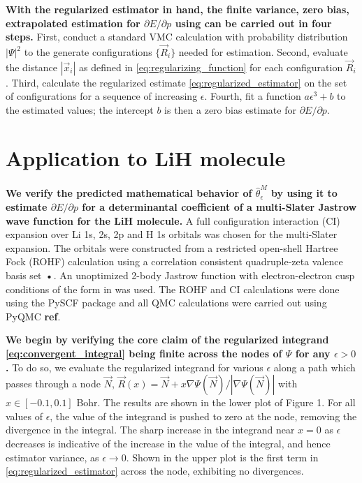\documentclass{article}
\begin{document}
\textbf{With the regularized estimator in hand, the finite variance, zero bias, extrapolated estimation for $\partial E/\partial p$ using can be carried out in four steps.}
First, conduct a standard VMC calculation with probability distribution $|\Psi|^2$ to the generate configurations $\{\vec{R}_i\}$ needed for estimation.
Second, evaluate the distance $|\vec{x}_i|$ as defined in \eqref{eq:regularizing_function} for each configuration $\vec{R}_i$.
Third, calculate the regularized estimate \eqref{eq:regularized_estimator} on the set of configurations for a sequence of increasing $\epsilon$.
Fourth, fit a function $a\epsilon^3 + b$ to the estimated values; the intercept $b$ is then a zero bias estimate for $\partial E/\partial p.$

\section{Application to LiH molecule}
\textbf{We verify the predicted mathematical behavior of $\hat{\theta}_\epsilon^M$ by using it to estimate $\partial E/\partial p$ for a determinantal coefficient of a multi-Slater Jastrow wave function for the LiH molecule.}
A full configuration interaction (CI) expansion over Li 1s, 2s, 2p and H 1s orbitals was chosen for the multi-Slater expansion.
The orbitals were constructed from a restricted open-shell Hartree Fock (ROHF) calculation using a correlation consistent quadruple-zeta valence basis set \cite{doi:10.1063/1.456153}\textbf{•}.
An unoptimized 2-body Jastrow function with electron-electron cusp conditions of the form in \cite{Wagner2009} was used.
The ROHF and CI calculations were done using the PySCF package \cite{PYSCF} and all QMC calculations were carried out using PyQMC \textbf{ref}.

\textbf{We begin by verifying the core claim of the regularized integrand \eqref{eq:convergent_integral} being finite across the nodes of $\Psi$ for any $\epsilon > 0$.}
To do so, we evaluate the regularized integrand for various $\epsilon$ along a path which passes through a node $\vec{N}$, $\vec{R}(x) = \vec{N} + x \nabla \Psi(\vec{N})/|\nabla \Psi(\vec{N})|$ with $x \in [-0.1, 0.1]$ Bohr.
The results are shown in the lower plot of Figure 1.
For all values of $\epsilon$, the value of the integrand is pushed to zero at the node, removing the divergence in the integral.
The sharp increase in the integrand near $x=0$ as $\epsilon$ decreases is indicative of the increase in the value of the integral, and hence estimator variance, as $\epsilon \rightarrow 0$.
Shown in the upper plot is the first term in \eqref{eq:regularized_estimator} across the node, exhibiting no divergences.
\end{document}
